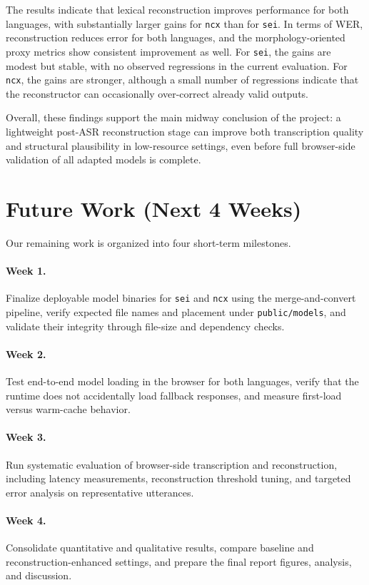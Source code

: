 \documentclass[11pt]{article}
\begin{document}
The results indicate that lexical reconstruction improves performance for both languages, with substantially larger gains for \texttt{ncx} than for \texttt{sei}. In terms of WER, reconstruction reduces error for both languages, and the morphology-oriented proxy metrics show consistent improvement as well. For \texttt{sei}, the gains are modest but stable, with no observed regressions in the current evaluation. For \texttt{ncx}, the gains are stronger, although a small number of regressions indicate that the reconstructor can occasionally over-correct already valid outputs.

Overall, these findings support the main midway conclusion of the project: a lightweight post-ASR reconstruction stage can improve both transcription quality and structural plausibility in low-resource settings, even before full browser-side validation of all adapted models is complete.

\section{Future Work (Next 4 Weeks)}
Our remaining work is organized into four short-term milestones.

\paragraph{Week 1.}
Finalize deployable model binaries for \texttt{sei} and \texttt{ncx} using the merge-and-convert pipeline, verify expected file names and placement under \texttt{public/models}, and validate their integrity through file-size and dependency checks.

\paragraph{Week 2.}
Test end-to-end model loading in the browser for both languages, verify that the runtime does not accidentally load fallback responses, and measure first-load versus warm-cache behavior.

\paragraph{Week 3.}
Run systematic evaluation of browser-side transcription and reconstruction, including latency measurements, reconstruction threshold tuning, and targeted error analysis on representative utterances.

\paragraph{Week 4.}
Consolidate quantitative and qualitative results, compare baseline and reconstruction-enhanced settings, and prepare the final report figures, analysis, and discussion.
\end{document}
